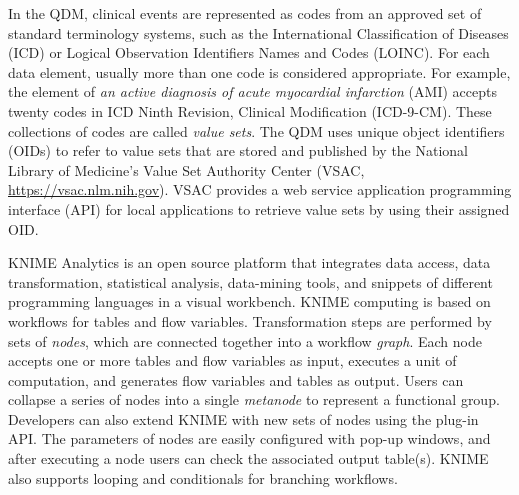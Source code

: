 \documentclass{article}
\begin{document}
In the QDM, clinical events are represented as codes from an approved set of standard terminology systems, such as the International Classification of Diseases (ICD) or Logical Observation Identifiers Names and Codes (LOINC). For each data element, usually more than one code is considered appropriate. For example, the element of \emph{an active diagnosis of acute myocardial infarction} (AMI) accepts twenty codes in ICD Ninth Revision, Clinical Modification (ICD-9-CM). These collections of codes are called \emph{value sets}. The QDM uses unique object identifiers (OIDs) to refer to value sets that are stored and published by the National Library of Medicine's Value Set Authority Center (VSAC, \url{https://vsac.nlm.nih.gov}). VSAC provides a web service application programming interface (API) for local applications to retrieve value sets by using their assigned OID.

KNIME Analytics is an open source platform that integrates data access, data transformation, statistical analysis, data-mining tools, and snippets of different programming languages in a visual workbench. KNIME computing is based on workflows for tables and flow variables. Transformation steps are performed by sets of \emph{nodes}, which are connected together into a workflow \emph{graph}. Each node accepts one or more tables and flow variables as input, executes a unit of computation, and generates flow variables and tables as output. Users can collapse a series of nodes into a single \emph{metanode} to represent a functional group. Developers can also extend KNIME with new sets of nodes using the plug-in API. The parameters of nodes are easily configured with pop-up windows, and after executing a node users can check the associated output table(s). KNIME also supports looping and conditionals for branching workflows. 

\end{document}
